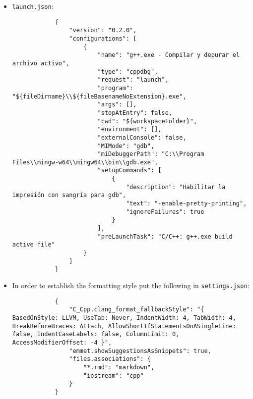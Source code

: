 \begin{itemize}
    \item \verb|launch.json|:
        \begin{verbatim}
            {
                "version": "0.2.0",
                "configurations": [
                    {
                        "name": "g++.exe - Compilar y depurar el archivo activo",
                        "type": "cppdbg",
                        "request": "launch",
                        "program": "${fileDirname}\\${fileBasenameNoExtension}.exe",
                        "args": [],
                        "stopAtEntry": false,
                        "cwd": "${workspaceFolder}",
                        "environment": [],
                        "externalConsole": false,
                        "MIMode": "gdb",
                        "miDebuggerPath": "C:\\Program Files\\mingw-w64\\mingw64\\bin\\gdb.exe",
                        "setupCommands": [
                            {
                                "description": "Habilitar la impresión con sangría para gdb",
                                "text": "-enable-pretty-printing",
                                "ignoreFailures": true
                            }
                        ],
                        "preLaunchTask": "C/C++: g++.exe build active file"
                    }
                ]
            }
        \end{verbatim}
    
    \item In order to establish the formatting style put the following in \verb|settings.json|:
        \begin{verbatim}
            {
                "C_Cpp.clang_format_fallbackStyle": "{ BasedOnStyle: LLVM, UseTab: Never, IndentWidth: 4, TabWidth: 4, BreakBeforeBraces: Attach, AllowShortIfStatementsOnASingleLine: false, IndentCaseLabels: false, ColumnLimit: 0, AccessModifierOffset: -4 }",
                "emmet.showSuggestionsAsSnippets": true,
                "files.associations": {
                    "*.rmd": "markdown",
                    "iostream": "cpp"
                }
            }
        \end{verbatim}
    

\end{itemize}
